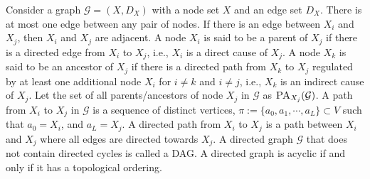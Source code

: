 Consider a graph $\mathcal{G} =({X},{D}_{{X}})$ with a node set ${X}$ and an edge set ${D}_{{X}}$. There is at most one edge between any pair of nodes. If there is an edge between $X_i$ and $X_j$, then $X_i$ and $X_j$ are adjacent. A node $X_i$ is said to be a parent of $X_j$ if there is a directed edge from $X_i$ to $X_j$, i.e., $X_i$ is a direct cause of $X_j$. A node $X_k$ is said to be an ancestor of $X_j$ if there is a directed path from $X_k$ to $X_j$ regulated by at least one additional node $X_i$ for $i\not =k$ and $i \not =j$, i.e., $X_k$ is an indirect cause of $X_j$. Let the set of all parents/ancestors of node $X_j$ in $\mathcal{G}$ as $\textsc{PA}_{X_j} (\mathcal{G})$. A path from $X_i$ to $X_j$ in $\mathcal{G}$ is a sequence of distinct vertices, $\pi := \{a_0, a_1,\cdots,a_L\}\subset V$ such that $a_0 =X_i$, and $a_L=X_j$. A directed path from $X_i$ to $X_j$ is a path between $X_i$ and $X_j$ where all edges are directed towards $X_j$.  A directed graph $\mathcal{G}$ that does not contain directed cycles is called a \acrfull{DAG}. A directed graph is acyclic if and only if it has a topological ordering. 


